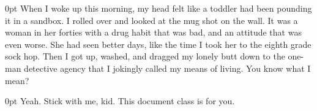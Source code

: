 \documentclass{novel} %
\begin{document}
\begin{adjustwidth}{\parindent}{0pt}
\backindent{}When I woke up this morning, my head felt like a toddler had been pounding it in a sandbox. I rolled over and looked at the mug shot on the wall. It was a woman in her forties with a drug habit that
was bad, and an attitude that was even worse. She had seen better days, like the time I took her to the eighth grade sock hop. Then I got up, washed, and dragged my lonely butt down to the one-man detective agency that I jokingly called my means of living. You know what I mean?
\end{adjustwidth}
\begin{adjustwidth}{\parindent}{0pt}
\backindent{}Yeah. Stick with me, kid. This document class is for you.
\end{adjustwidth}
\end{document}
